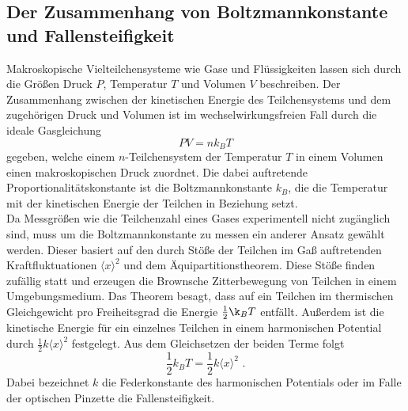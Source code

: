 \subsection{Der Zusammenhang von Boltzmannkonstante und Fallensteifigkeit}
Makroskopische Vielteilchensysteme wie Gase und Flüssigkeiten lassen sich durch die Größen Druck $P$, Temperatur $T$ und Volumen $V$ beschreiben.
Der Zusammenhang zwischen der kinetischen Energie des Teilchensystems und dem zugehörigen Druck und Volumen ist im wechselwirkungsfreien Fall durch die ideale Gasgleichung
\begin{equation}
  PV = n k_B T
\end{equation}
gegeben, welche einem $n$-Teilchensystem der Temperatur $T$ in einem Volumen einen makroskopischen Druck zuordnet.
Die dabei auftretende Proportionalitätskonstante ist die Boltzmannkonstante $k_B$, die die Temperatur mit der kinetischen Energie der Teilchen in Beziehung setzt.\\
Da Messgrößen wie die Teilchenzahl eines Gases experimentell nicht zugänglich sind, muss um die Boltzmannkonstante zu messen ein anderer Ansatz gewählt werden. Dieser basiert auf den durch Stöße der Teilchen im Gaß auftretenden Kraftfluktuationen $\langle x \rangle ^2$ und dem Äquipartitionstheorem. Diese Stöße finden zufällig statt und erzeugen die Brownsche Zitterbewegung von Teilchen in einem Umgebungsmedium. Das Theorem besagt, dass auf ein Teilchen im thermischen Gleichgewicht pro Freiheitsgrad die Energie $\frac{1}{2}\k_B T$ entfällt. Außerdem ist die kinetische Energie für ein einzelnes Teilchen in einem harmonischen Potential durch $\frac{1}{2} k \langle x \rangle^2$ festgelegt. Aus dem Gleichsetzen der beiden Terme
folgt
\begin{equation}
  \frac{1}{2}k_B T = \frac{1}{2} k \langle x \rangle^2 \,\,.
\end{equation}
Dabei bezeichnet $k$ die Federkonstante des harmonischen Potentials oder im Falle der optischen Pinzette die Fallensteifigkeit. \cite{anleitung}\\

